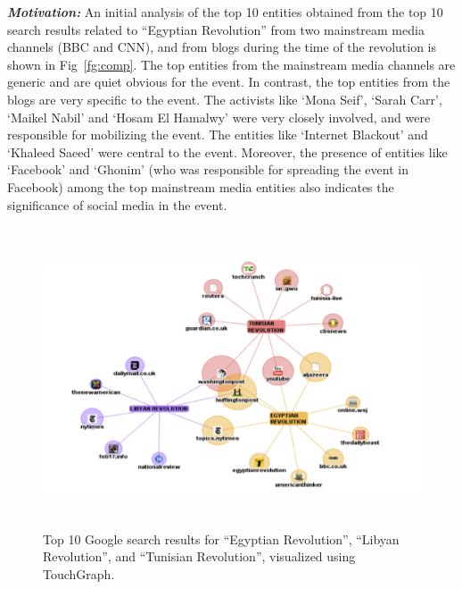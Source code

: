 \noindent \textbf{\textit{Motivation:}} An initial analysis of the top 10 entities obtained from the top 10 search results related to ``Egyptian Revolution'' from two mainstream media channels (BBC and CNN), and from blogs during the time of the revolution is shown in Fig~\ref{fg:comp}. The top entities from the mainstream media channels are generic and are quiet obvious for the event. In contrast, the top entities from the blogs are very specific to the event. The activists like `Mona Seif', `Sarah Carr', `Maikel Nabil' and `Hosam El Hamalwy' were very closely involved, and were responsible for mobilizing the event. The entities like `Internet Blackout' and `Khaleed Saeed' were central to the event. Moreover, the presence of entities like `Facebook' and `Ghonim' (who was responsible for spreading the event in Facebook) among the top mainstream media entities also indicates the significance of social media in the event.

\begin{figure}[htb]
\centering
\includegraphics[height=3.5in,width=4.5in]{Figures/Chapter3Figures/touchgraph.jpg} 

\caption{\small Top 10 Google search results for ``Egyptian Revolution'', ``Libyan Revolution'', and ``Tunisian Revolution'', visualized using TouchGraph.}

\label{fg:touchgraph}

\end{figure}


